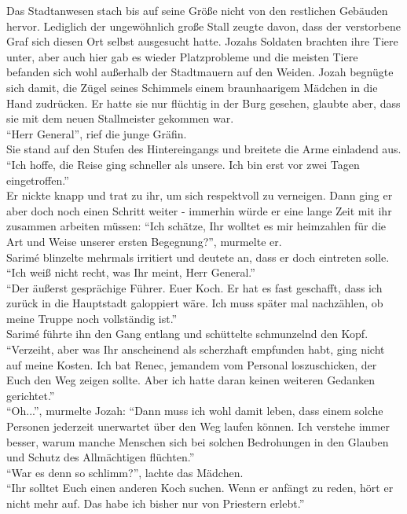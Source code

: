 Das Stadtanwesen stach bis auf seine Größe nicht von den restlichen Gebäuden hervor. Lediglich der 
ungewöhnlich große Stall zeugte davon, dass der verstorbene Graf sich diesen Ort selbst ausgesucht 
hatte. Jozahs Soldaten brachten ihre Tiere unter, aber auch hier gab es wieder Platzprobleme und 
die meisten Tiere befanden sich wohl außerhalb der Stadtmauern auf den Weiden. Jozah begnügte sich 
damit, die Zügel seines Schimmels einem braunhaarigem Mädchen in die Hand zudrücken. Er hatte sie 
nur flüchtig in der Burg gesehen, glaubte aber, dass sie mit dem neuen Stallmeister gekommen war.\\
``Herr General'', rief die junge Gräfin.\\
Sie stand auf den Stufen des Hintereingangs und breitete die Arme einladend aus. ``Ich hoffe, die 
Reise ging schneller als unsere. Ich bin erst vor zwei Tagen eingetroffen.''\\
Er nickte knapp und trat zu ihr, um sich respektvoll zu verneigen. Dann ging er aber doch noch 
einen Schritt weiter - immerhin würde er eine lange Zeit mit ihr zusammen arbeiten müssen: 
``Ich schätze, Ihr wolltet es mir heimzahlen für die Art und Weise unserer ersten Begegnung?'', 
murmelte er.\\
Sarimé blinzelte mehrmals irritiert und deutete an, dass er doch eintreten solle. ``Ich weiß nicht 
recht, was Ihr meint, Herr General.''\\
``Der äußerst gesprächige Führer. Euer Koch. Er hat es fast geschafft, dass ich zurück in die 
Hauptstadt galoppiert wäre. Ich muss später mal nachzählen, ob meine Truppe noch vollständig 
ist.''\\
Sarimé führte ihn den Gang entlang und schüttelte schmunzelnd den Kopf. ``Verzeiht, aber was Ihr 
anscheinend als scherzhaft empfunden habt, ging nicht auf meine Kosten. Ich bat Renec, jemandem 
vom Personal loszuschicken, der Euch den Weg zeigen sollte. Aber ich hatte daran keinen weiteren 
Gedanken gerichtet.''\\
``Oh...'', murmelte Jozah: ``Dann muss ich wohl damit leben, dass einem solche Personen jederzeit 
unerwartet über den Weg laufen können. Ich verstehe immer besser, warum manche Menschen sich bei 
solchen Bedrohungen in den Glauben und Schutz des Allmächtigen flüchten.''\\
``War es denn so schlimm?'', lachte das Mädchen.\\
``Ihr solltet Euch einen anderen Koch suchen. Wenn er anfängt zu reden, hört er nicht mehr auf. Das 
habe ich bisher nur von Priestern erlebt.''
